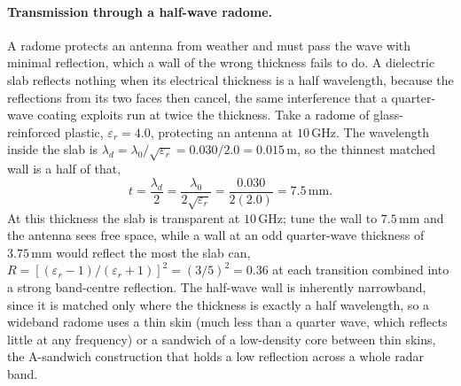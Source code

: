 \paragraph{Transmission through a half-wave radome.}
A radome protects an antenna from weather and must pass the wave with
minimal reflection, which a wall of the wrong thickness fails to do. A
dielectric slab reflects nothing when its electrical thickness is a half
wavelength, because the reflections from its two faces then cancel, the
same interference that a quarter-wave coating exploits run at twice the
thickness. Take a radome of glass-reinforced plastic, $\varepsilon_r =
4.0$, protecting an antenna at $10\,\si{\giga\hertz}$. The wavelength inside
the slab is $\lambda_d = \lambda_0/\sqrt{\varepsilon_r} = 0.030/2.0 =
0.015\,\si{\meter}$, so the thinnest matched wall is a half of that,
\[
t = \frac{\lambda_d}{2} = \frac{\lambda_0}{2\sqrt{\varepsilon_r}} =
\frac{0.030}{2(2.0)} = 7.5\,\si{\milli\meter}.
\]
At this thickness the slab is transparent at $10\,\si{\giga\hertz}$;
tune the wall to $7.5\,\si{\milli\meter}$ and the antenna sees free space,
while a wall at an odd quarter-wave thickness of $3.75\,\si{\milli\meter}$
would reflect the most the slab can, $R = [(\varepsilon_r-1)/
(\varepsilon_r+1)]^2 = (3/5)^2 = 0.36$ at each transition combined into a
strong band-centre reflection. The half-wave wall is inherently
narrowband, since it is matched only where the thickness is exactly a half
wavelength, so a wideband radome uses a thin skin (much less than a
quarter wave, which reflects little at any frequency) or a sandwich of a
low-density core between thin skins, the A-sandwich construction that
holds a low reflection across a whole radar band.

